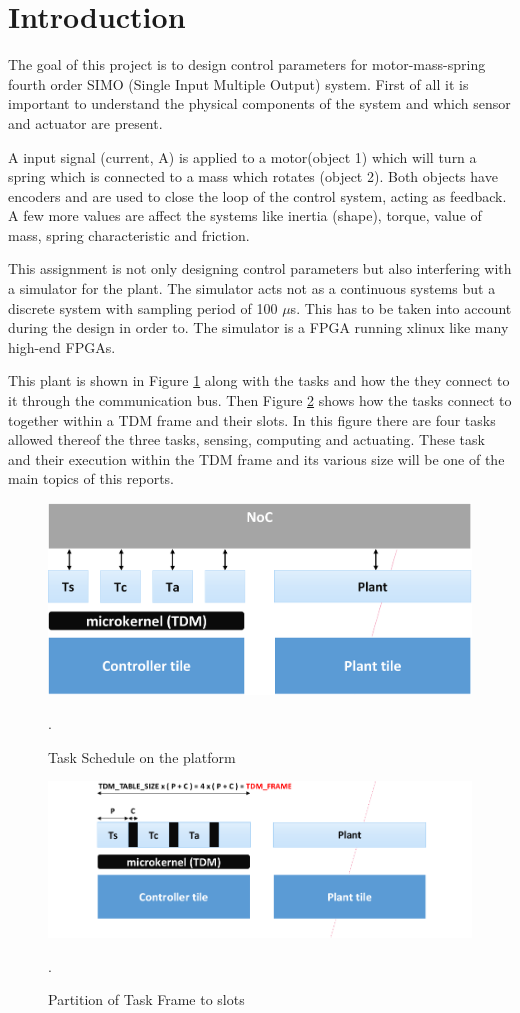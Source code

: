 \section{Introduction}
The goal of this project is to design control parameters for motor-mass-spring fourth order SIMO (Single Input Multiple Output) system. First of all it is important to understand the physical components of the system and which sensor and actuator are present.

A input signal (current, A) is applied to a motor(object 1) which will turn a spring which is connected to a mass which rotates (object 2). Both objects have encoders and are used to close the loop of the control system, acting as feedback. A few more values are affect the systems like inertia (shape), torque, value of mass, spring characteristic and friction.

This assignment is not only designing control parameters but also interfering with a simulator for the plant. The simulator acts not as a continuous systems but a discrete system with sampling period of 100 $\mu$s. This has to be taken into account during the design in order to. The simulator is a FPGA running xlinux like many high-end FPGAs.

This plant is shown in Figure \ref{fig:plant} along with the tasks and how the they connect to it through the communication bus. Then Figure \ref{fig:task} shows how the tasks connect to together within a TDM frame and their slots. In this figure there are four tasks allowed thereof the three tasks, sensing, computing and actuating. These task and their execution within the TDM frame and its various size will be one of the main topics of this reports.

\begin{figure}[h]
	\begin{center}
		\includegraphics[width=0.7\linewidth]{img/plant}
		\caption{Task Schedule on the platform}.
		\label{fig:plant}
	\end{center}
\end{figure}

\begin{figure}[h]
	\begin{center}
		\includegraphics[width=0.7\linewidth]{img/task}
		\caption{Partition of Task Frame to slots}.
		\label{fig:task}
	\end{center}
\end{figure}




